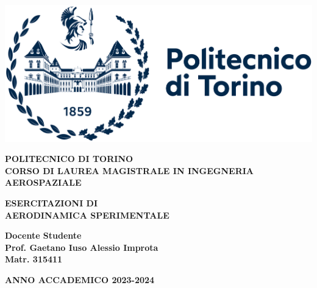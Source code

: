 \pagestyle{empty}

\vspace{.4cm}

\begin{center}
    \includegraphics[width=.46\textwidth]{images/polito.png}
\end{center}

\vspace{.2cm}

\begin{center}
    \Large{\textbf{POLITECNICO DI TORINO}}\\
    \vspace{0.2cm}
    \large{\textbf{CORSO DI LAUREA MAGISTRALE IN INGEGNERIA AEROSPAZIALE}}
\end{center}

\vspace{2.5cm}

\begin{center}
    \LARGE{\textbf{ESERCITAZIONI DI\\AERODINAMICA SPERIMENTALE}}
\end{center}

\vspace{2cm}

\begin{flushleft}
    \linespread{1}
    \large{\textbf{Docente \hfill Studente}\\
    \textbf{Prof. Gaetano Iuso \hfill Alessio Improta\\
    \hfill Matr. 315411}
    }
\end{flushleft}

\vfill

\begin{center}
    \large{\textbf{ANNO ACCADEMICO 2023-2024}}
\end{center} 

\clearpage
\restoregeometry